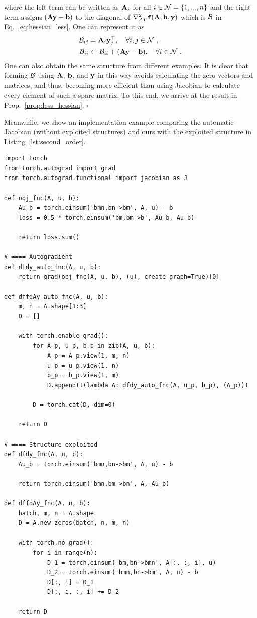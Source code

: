 where the left term can be written as $\mathbf{A}_i$ for all $i \in \mathcal{N} = \{1, ..., n\}$ and
the right term assigns $(\mathbf{A} \mathbf{y} - \mathbf{b})$ to the diagonal of $\nabla^2_{AY} \texttt{f}(\mathbf{A}, \mathbf{b}, \mathbf{y})$ which is $\mathcal{B}$ in Eq.~\eqref{eq:hessian_less}.
One can represent it as
\begin{align}
    \mathcal{B}_{ij} &= \mathbf{A}_i \mathbf{y}^\top_j, \quad \forall i, j \in \mathcal{N}\ ,\\
    \mathcal{B}_{ii} &\leftarrow \mathcal{B}_{ii} + (\mathbf{A} \mathbf{y} - \mathbf{b}), \quad \forall i \in \mathcal{N}\ .
\end{align}
One can also obtain the same structure from different examples.
It is clear that forming $\mathcal{B}$ using $\mathbf{A}$, $\mathbf{b}$, and $\mathbf{y}$ in this way avoids calculating the zero vectors and matrices, and thus, becoming more efficient than using Jacobian to calculate every element of such a spare matrix.
To this end, we arrive at the result in Prop.~\ref{prop:less_hessian}. $\square$

\clearpage
Meanwhile, we show an implementation example comparing the automatic Jacobian (without exploited structures) and ours with the exploited structure in Listing~\ref{lst:second_order}.
%
\begin{lstlisting}[basicstyle=\footnotesize\ttfamily,linewidth=16cm,label={lst:second_order},caption={\textit{\normalsize \hspace{8mm}An implementation example of exploited Hessian structure for LESS.}\\}]
import torch
from torch.autograd import grad
from torch.autograd.functional import jacobian as J

def obj_fnc(A, u, b):
    Au_b = torch.einsum('bmn,bn->bm', A, u) - b
    loss = 0.5 * torch.einsum('bm,bm->b', Au_b, Au_b)

    return loss.sum()

# ==== Autogradient
def dfdy_auto_fnc(A, u, b):
    return grad(obj_fnc(A, u, b), (u), create_graph=True)[0]

def dffdAy_auto_fnc(A, u, b):
    m, n = A.shape[1:3]
    D = []

    with torch.enable_grad():
        for A_p, u_p, b_p in zip(A, u, b):
            A_p = A_p.view(1, m, n)
            u_p = u_p.view(1, n)
            b_p = b_p.view(1, m)
            D.append(J(lambda A: dfdy_auto_fnc(A, u_p, b_p), (A_p)))

        D = torch.cat(D, dim=0)

    return D

# ==== Structure exploited
def dfdy_fnc(A, u, b):
    Au_b = torch.einsum('bmn,bn->bm', A, u) - b

    return torch.einsum('bmn,bm->bn', A, Au_b)

def dffdAy_fnc(A, u, b):
    batch, m, n = A.shape
    D = A.new_zeros(batch, n, m, n)

    with torch.no_grad():
        for i in range(n):
            D_1 = torch.einsum('bm,bn->bmn', A[:, :, i], u)
            D_2 = torch.einsum('bmn,bn->bm', A, u) - b
            D[:, i] = D_1
            D[:, i, :, i] += D_2

    return D
\end{lstlisting}

